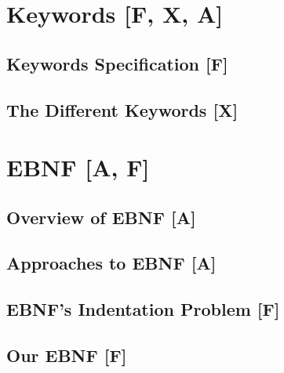 \documentclass[12pt,a4paper,twoside,open=right,titlepage,listof=totoc,bibliography=totoc,chapteratlists=0pt]{scrreprt}
\begin{document}
\part{Keywords [F, X, A]}\label{part:keywords}

\chapter{Keywords Specification [F]}\label{chap:keywords-specification}


\chapter{The Different Keywords [X]}\label{chap:keywords-list}


\part{EBNF [A, F]}\label{part:ebnf}

\chapter{Overview of EBNF [A]}\label{chap:ebnf-overview}


\chapter{Approaches to EBNF [A]}\label{chap:ebnf-approaches}


\chapter{EBNF's Indentation Problem [F]}\label{chap:ebnf-problem}


\chapter{Our EBNF [F]}\label{chap:our-ebnf}

\end{document}
